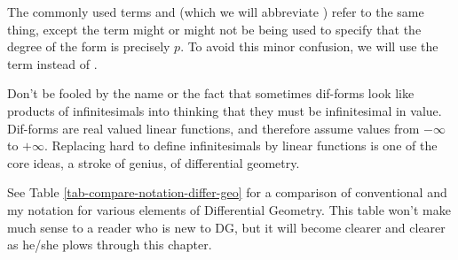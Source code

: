 The commonly 
used terms  
and  (which we will abbreviate ) refer to the same thing,
except the term 
might or might not be 
being used to
specify that the degree of the form 
is precisely $p$.
To avoid this minor confusion, we 
will use the term 
instead of .

Don't be fooled by
the name 
or the
fact that sometimes 
dif-forms
look like products of infinitesimals
into thinking that they must
be infinitesimal in value.
Dif-forms are
real valued linear functions,
and therefore 
assume values
from $-\infty$ to
$+\infty$.
Replacing
hard to define
infinitesimals by linear functions is 
one of the core ideas,
a stroke of genius, of differential geometry. 

See Table \ref{tab-compare-notation-differ-geo}
for a comparison of conventional and my notation for
various 
elements of 
 Differential Geometry.
This table won't make
much sense to a reader
who is new to DG,
but it will become 
clearer and clearer
as he/she plows through this 
chapter. 



